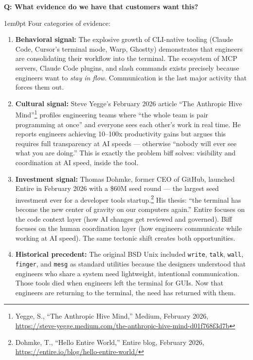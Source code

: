 \documentclass[11pt,letterpaper]{article}
\newcounter{faqnum}
\newenvironment{faqpair}[1]{%
  \needspace{4\baselineskip}%
  \vspace{0.5em}%
  \refstepcounter{faqnum}%
  \noindent\textbf{\color{SectionBlue}Q\thefaqnum: #1}\par\nopagebreak[4]%
  \vspace{0.2em}%
  \begin{adjustwidth}{1em}{0pt}%
  \setlength{\parindent}{0pt}%
}{%
  \end{adjustwidth}%
  \vspace{0.5em}%
}
\begin{document}
\begin{faqpair}{What evidence do we have that customers want this?}\label{faq:evidence}
  Four categories of evidence:

  \begin{enumerate}[leftmargin=1.5em]
    \item \textbf{Behavioral signal:} The explosive growth of CLI-native
    tooling (Claude Code, Cursor's terminal mode, Warp, Ghostty) demonstrates
    that engineers are consolidating their workflow into the terminal. The
    ecosystem of MCP servers, Claude Code plugins, and slash commands exists
    precisely because engineers want to \emph{stay in flow}. Communication
    is the last major activity that forces them out.

    \item \textbf{Cultural signal:} Steve Yegge's February 2026 article
    ``The Anthropic Hive
    Mind''\footnote{Yegge, S., ``The Anthropic Hive Mind,'' Medium,
    February 2026,
    \url{https://steve-yegge.medium.com/the-anthropic-hive-mind-d01f768f3d7b}}
    profiles engineering teams where ``the whole team is pair programming
    at once'' and everyone sees each other's work in real time. He reports
    engineers achieving 10--100x productivity gains but argues this
    requires full transparency at AI speeds --- otherwise ``nobody will
    ever see what you are doing.'' This is exactly the problem biff
    solves: visibility and coordination at AI speed, inside the tool.

    \item \textbf{Investment signal:} Thomas Dohmke, former CEO of GitHub,
    launched Entire in February 2026 with a \$60M seed round --- the largest
    seed investment ever for a developer tools
    startup.\footnote{Dohmke, T., ``Hello Entire World,'' Entire blog,
    February 2026, \url{https://entire.io/blog/hello-entire-world/}}
    His thesis: ``the terminal has become the new center of gravity on our
    computers again.'' Entire focuses on the code context layer (how AI
    changes get reviewed and governed). Biff focuses on the human
    coordination layer (how engineers communicate while working at AI
    speed). The same tectonic shift creates both opportunities.

    \item \textbf{Historical precedent:} The original BSD Unix included
    \texttt{write}, \texttt{talk}, \texttt{wall}, \texttt{finger}, and
    \texttt{mesg} as standard utilities because the designers understood
    that engineers who share a system need lightweight, intentional
    communication. Those tools died when engineers left the terminal for
    GUIs. Now that engineers are returning to the terminal, the need has
    returned with them.
  \end{enumerate}
\end{faqpair}
\end{document}
